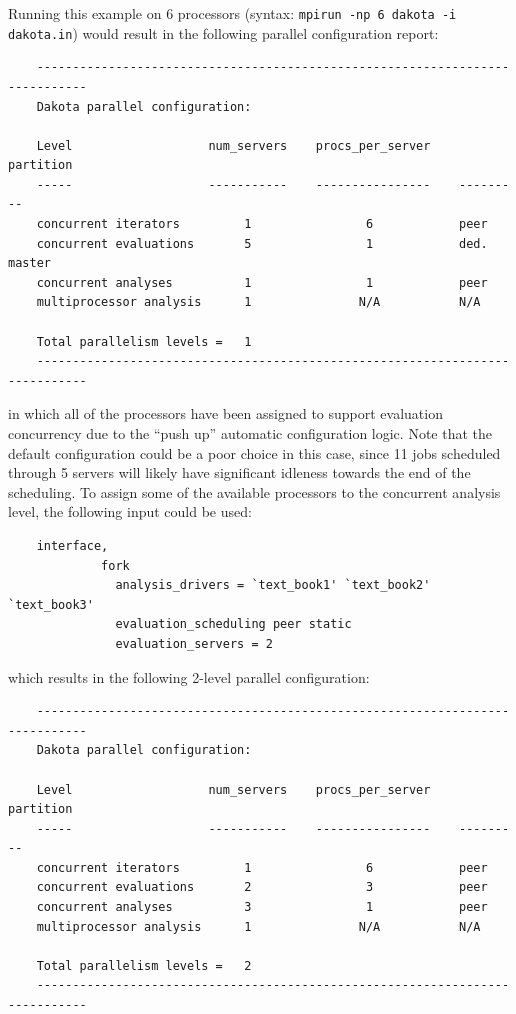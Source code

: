 Running this example on 6 processors (syntax: \texttt{mpirun -np 6
  dakota -i dakota.in}) would result in the following parallel
configuration report:
\begin{small}
\begin{verbatim}
    -----------------------------------------------------------------------------
    Dakota parallel configuration:

    Level                   num_servers    procs_per_server    partition
    -----                   -----------    ----------------    ---------
    concurrent iterators         1                6            peer
    concurrent evaluations       5                1            ded. master
    concurrent analyses          1                1            peer
    multiprocessor analysis      1               N/A           N/A

    Total parallelism levels =   1
    -----------------------------------------------------------------------------
\end{verbatim}
\end{small}

in which all of the processors have been assigned to support
evaluation concurrency due to the ``push up'' automatic configuration
logic. Note that the default configuration could be a poor choice in
this case, since 11 jobs scheduled through 5 servers will likely have
significant idleness towards the end of the scheduling.  To assign
some of the available processors to the concurrent analysis level, the
following input could be used:
\begin{small}
\begin{verbatim}
    interface,
             fork
               analysis_drivers = `text_book1' `text_book2' `text_book3'
               evaluation_scheduling peer static
               evaluation_servers = 2
\end{verbatim}
\end{small}

which results in the following 2-level parallel configuration:
\begin{small}
\begin{verbatim}
    -----------------------------------------------------------------------------
    Dakota parallel configuration:

    Level                   num_servers    procs_per_server    partition
    -----                   -----------    ----------------    ---------
    concurrent iterators         1                6            peer
    concurrent evaluations       2                3            peer
    concurrent analyses          3                1            peer
    multiprocessor analysis      1               N/A           N/A

    Total parallelism levels =   2
    -----------------------------------------------------------------------------
\end{verbatim}
\end{small}

